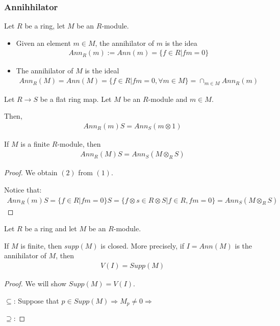 \documentclass[Total.tex]{subfiles}
\begin{document}
			\subsubsection{Annihhilator}
			\begin{Def}
				Let $R$ be a ring, let $M$ be an $R$-module.
				\begin{itemize}
					\item Given an element $m\in M$, the annihilator of $m$ is the idea
					\begin{gather*}
						Ann_R (m):=Ann(m)=\{f\in R|fm=0\}
					\end{gather*}
					\item The annihilator of $M$ is the ideal
					\begin{gather*}
						Ann_R(M)=Ann(M)=\{f\in R|fm=0,\forall m\in M\}=\cap_{m\in M} Ann_R(m)
					\end{gather*}
				\end{itemize}
			\end{Def}
			
			\begin{lemma}
				Let $R\rightarrow S$ be a flat ring map. Let $M$ be an $R$-module and $m\in M$.
				
				Then, 
				\begin{gather*}
					Ann_R(m)S=Ann_S(m\otimes 1)
				\end{gather*}
				
				If $M$ is a finite $R$-module, then
				\begin{gather*}
					Ann_R(M)S=Ann_S(M\otimes_R S)
				\end{gather*}
			\end{lemma}
			\begin{proof}
				We obtain $(2)$ from $(1)$.
				
				Notice that:
				\begin{gather*}
					Ann_R(m)S=\{f\in R|fm=0\}S=\{f\otimes s\in R\otimes S|f\in R,fm=0\}=Ann_S(M\otimes_R S)
				\end{gather*}
			\end{proof}
			
			\begin{lemma}
				Let $R$ be a ring and let $M$ be an $R$-module.
				
				If $M$ is finite, then $supp(M)$ is closed. More precisely, if $I=Ann(M)$ is the annihilator of $M$, then
				\begin{gather*}
					V(I)=Supp(M)
				\end{gather*}
			\end{lemma}
			\begin{proof}
				We will show $Supp(M)=V(I)$.
				
				$\subseteq$: Suppose that $p\in Supp(M)\Rightarrow M_p\not=0\Rightarrow$
				
				$\supseteq$:
			\end{proof}
			
\end{document}
